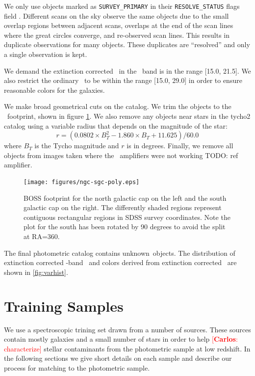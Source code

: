 \documentclass[preprint]{aastex}
\newcommand{\modelrmin}{15.0}
\newcommand{\modelrmax}{29.0}
\newcommand{\rmin}{15.0}
\newcommand{\rmax}{21.5}
\newcommand{\nphoto}{unknown}
\newcommand{\cc}[1]{\textcolor{red}{[{\bf Carlos}: #1]}}
\begin{document}
We only use objects marked as \texttt{SURVEY\_PRIMARY} in their
\texttt{RESOLVE\_STATUS} flags field \citep{dr7resolve}. Different scans on the
sky observe the same objects due to the small overlap regions between adjacent
scans, overlaps at the end of the scan lines where the great circles converge,
and re-observed scan lines.  This results in duplicate observations for many
objects.  These duplicates are ``resolved'' and only a single observation is
kept.

We demand the extinction corrected \citep{Schlegel98} \cmodelmag\ in the \rmag\
band is in the range [\rmin, \rmax].  We also restrict the ordinary \modelmag\
to be within the range [\modelrmin, \modelrmax] in order to ensure reasonable
colors for the galaxies.

We make broad geometrical cuts on the catalog.  We trim the objects to the
\boss\ footprint, shown in figure \ref{fig:footprint}. We also remove any
objects near stars in the tycho2 catalog \citep{tycho2} using a variable radius
that depends on the magnitude of the star:
\begin{equation}
r = (0.0802\times B_T^2 - 1.860\times B_T + 11.625)/60.0
\end{equation}
where $B_T$ is the Tycho magnitude and $r$ is in degrees.  Finally, we remove
all objects from images taken where the \umag\ amplifiers were not working
TODO: ref amplifier.

\begin{figure}[t] \centering
 \centering 
 \texttt{[image: figures/ngc-sgc-poly.eps]}
 \caption{BOSS footprint for the north galactic cap on the left
 and the south galactic cap on the right.  The differently shaded
 regions represent contiguous rectangular regions in SDSS survey coordinates.
 Note the plot for the south has been rotated by 90 degrees to avoid
 the split at RA=360.}
 \label{fig:footprint}
\end{figure}

The final photometric catalog contains \nphoto\ objects.  The distribution of
extinction corrected \rmag-band \cmodelmag\ and colors derived from extinction
corrected \modelmag\ are shown in \ref{fig:varhist}.

\section{Training Samples} \label{sec:train}

We use a spectroscopic trining set drawn from a number of sources. These
sources contain mostly galaxies and a small number of stars in order
to help \cc{characterize} stellar contaminants from the photometric sample at low
redshift. In the following sections we give short details on each sample
and describe our process for matching to the photometric sample.
\end{document}
